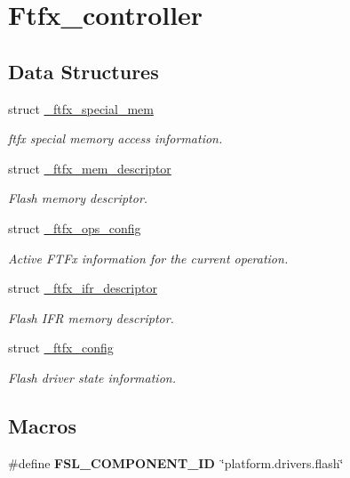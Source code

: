 \hypertarget{group__ftfx__controller}{}\section{Ftfx\+\_\+controller}
\label{group__ftfx__controller}
\subsection*{Data Structures}
\begin{DoxyCompactItemize}
\item 
struct \mbox{\hyperlink{struct__ftfx__special__mem}{\+\_\+ftfx\+\_\+special\+\_\+mem}}
\begin{DoxyCompactList}\small\item\em ftfx special memory access information. \end{DoxyCompactList}\item 
struct \mbox{\hyperlink{struct__ftfx__mem__descriptor}{\+\_\+ftfx\+\_\+mem\+\_\+descriptor}}
\begin{DoxyCompactList}\small\item\em Flash memory descriptor. \end{DoxyCompactList}\item 
struct \mbox{\hyperlink{struct__ftfx__ops__config}{\+\_\+ftfx\+\_\+ops\+\_\+config}}
\begin{DoxyCompactList}\small\item\em Active F\+T\+Fx information for the current operation. \end{DoxyCompactList}\item 
struct \mbox{\hyperlink{struct__ftfx__ifr__descriptor}{\+\_\+ftfx\+\_\+ifr\+\_\+descriptor}}
\begin{DoxyCompactList}\small\item\em Flash I\+FR memory descriptor. \end{DoxyCompactList}\item 
struct \mbox{\hyperlink{struct__ftfx__config}{\+\_\+ftfx\+\_\+config}}
\begin{DoxyCompactList}\small\item\em Flash driver state information. \end{DoxyCompactList}\end{DoxyCompactItemize}
\subsection*{Macros}
\begin{DoxyCompactItemize}
\item 
\mbox{\label{group__ftfx__controller_ga2006f7918566cde9a2653e05380af6dd}} 
\#define {\bfseries F\+S\+L\+\_\+\+C\+O\+M\+P\+O\+N\+E\+N\+T\+\_\+\+ID}~\char`\"{}platform.\+drivers.\+flash\char`\"{}
\end{DoxyCompactItemize}
